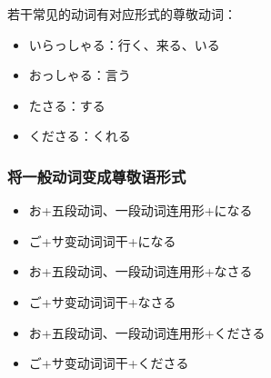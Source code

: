 若干常见的动词有对应形式的尊敬动词：
\begin{itemize}
  \item いらっしゃる：行く、来る、いる
  \item おっしゃる：言う
  \item たさる：する
  \item くださる：くれる
\end{itemize}

\subsubsection{将一般动词变成尊敬语形式}%

\begin{itemize}
  \item お+五段动词、一段动词连用形+になる
  \item ご+サ变动词词干+になる
  \item お+五段动词、一段动词连用形+なさる
  \item ご+サ变动词词干+なさる
  \item お+五段动词、一段动词连用形+くださる
  \item ご+サ变动词词干+くださる
\end{itemize}
